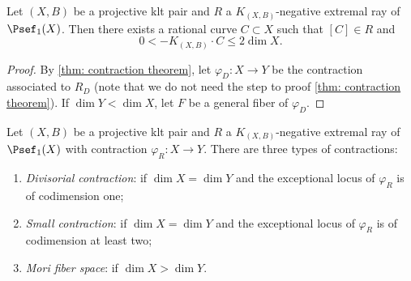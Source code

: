     \begin{theorem}\label{thm:length_of_extremal_rays}
        Let \((X,B)\) be a projective klt pair and \(R\) a \(K_{(X,B)}\)-negative extremal ray of \(\Psef_1(X)\).
        Then there exists a rational curve \(C \subset X\) such that \([C] \in R\) and
        \[ 0 < -K_{(X,B)} \cdot C \leq 2 \dim X. \]
    \end{theorem}
    \begin{proof}
        By \cref{thm: contraction theorem}, let \(\varphi_D: X \to Y\) be the contraction associated to \(R_D\) (note that we do not need the step to proof \cref{thm: contraction theorem}).
        If \(\dim Y < \dim X\), let \(F\) be a general fiber of \(\varphi_D\).
    \end{proof}

    \begin{definition}\label{def:types_of_contractions_in_MMP}
        Let \((X,B)\) be a projective klt pair and \(R\) a \(K_{(X,B)}\)-negative extremal ray of \(\Psef_1(X)\) with contraction \(\varphi_R: X \to Y\).
        There are three types of contractions:
        \begin{enumerate}
            \item \emph{Divisorial contraction}: if \(\dim X = \dim Y\) and the exceptional locus of \(\varphi_R\) is of codimension one;
            \item \emph{Small contraction}: if \(\dim X = \dim Y\) and the exceptional locus of \(\varphi_R\) is of codimension at least two;
            \item \emph{Mori fiber space}: if \(\dim X > \dim Y\).
        \end{enumerate}
    \end{definition}


